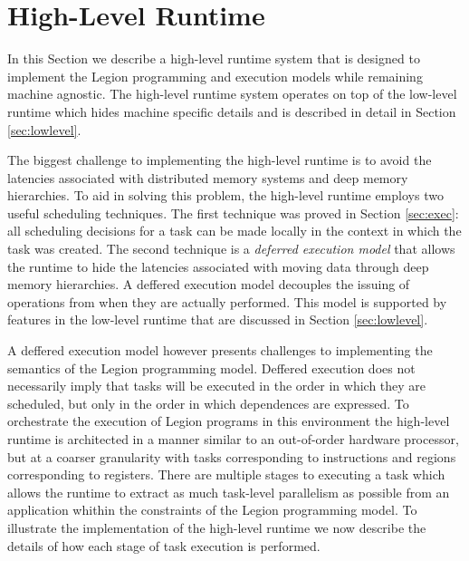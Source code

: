 
\section{High-Level Runtime} 
\label{sec:highlevel}
In this Section we describe a high-level runtime system
that is designed to implement the Legion programming
and execution models while remaining machine agnostic.  
The high-level runtime system operates on top of the 
low-level runtime which hides machine specific details
and is described in detail in Section \ref{sec:lowlevel}.

The biggest challenge to implementing the high-level
runtime is to avoid the latencies associated with distributed
memory systems and deep memory hierarchies.  To aid
in solving this problem, the high-level runtime employs two useful 
scheduling techniques.  The first technique was proved
in Section \ref{sec:exec}: all scheduling decisions for a
task can be made locally in the context in which the
task was created.  The second technique is a {\em deferred execution model} 
that allows the runtime to hide the latencies associated
with moving data through deep memory hierarchies.  A
deffered execution model decouples the issuing of operations
from when they are actually performed.  This model is supported
by features in the low-level runtime that are discussed in Section \ref{sec:lowlevel}.


A deffered execution model however presents challenges to implementing
the semantics of the Legion programming model.  Deffered execution
does not necessarily imply that tasks will be executed in the order in
which they are scheduled, but only in the order in which dependences
are expressed.  To orchestrate the execution of Legion
programs in this environment the high-level runtime is architected
in a manner similar to an out-of-order hardware processor, but at
a coarser granularity with tasks corresponding to instructions and
regions corresponding to registers.  There are multiple stages to 
executing a task which allows the runtime to extract
as much task-level parallelism as possible from an application whithin
the constraints of the Legion programming model.  To illustrate
the implementation of the high-level runtime we now describe the
details of how each stage of task execution is performed.

